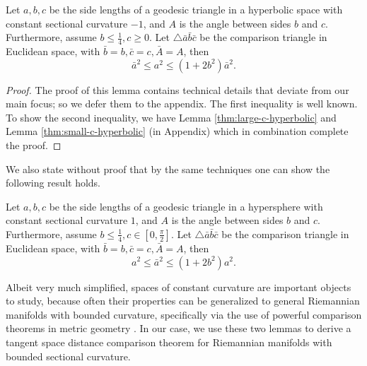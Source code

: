 \begin{lemma} \label{thm:hyperbolic-squared-distance-distortion}
	Let $a,b,c$ be the side lengths of a geodesic triangle in a hyperbolic space with constant sectional curvature $-1$, and $A$ is the angle between sides $b$ and $c$. Furthermore, assume $b\le\frac{1}{4},c\ge 0$. Let $\triangle\bar{a}\bar{b}\bar{c}$ be the comparison triangle in Euclidean space, with $\bar{b}=b,\bar{c}=c,\bar{A}=A$, then
	\begin{equation}
	\bar{a}^2 \le a^2\le (1+2b^2)\bar{a}^2.
	\end{equation}
\end{lemma}
\begin{proof}
	The proof of this lemma contains technical details that deviate from our main focus; so we defer them to the appendix. The first inequality is well known. To show the second inequality, we have Lemma \ref{thm:large-c-hyperbolic} and Lemma \ref{thm:small-c-hyperbolic} (in Appendix) which in combination complete the proof.
\end{proof}
We also state without proof that by the same techniques one can show the following result holds.
\begin{lemma} \label{thm:hypersphere-squared-distance-distortion}
	Let $a,b,c$ be the side lengths of a geodesic triangle in a hypersphere with constant sectional curvature $1$, and $A$ is the angle between sides $b$ and $c$. Furthermore, assume $b\le\frac{1}{4},c\in[0,\frac{\pi}{2}]$. Let $\triangle\bar{a}\bar{b}\bar{c}$ be the comparison triangle in Euclidean space, with $\bar{b}=b,\bar{c}=c,\bar{A}=A$, then
	\begin{equation}
	a^2\le \bar{a}^2\le (1+2b^2)a^2.
	\end{equation}
\end{lemma}
Albeit very much simplified, spaces of constant curvature are important objects to study, because often their properties can be generalized to general Riemannian manifolds with bounded curvature, specifically via the use of powerful comparison theorems in metric geometry \citep{burago2001course}. In our case, we use these two lemmas to derive a tangent space distance comparison theorem for Riemannian manifolds with bounded sectional curvature.
